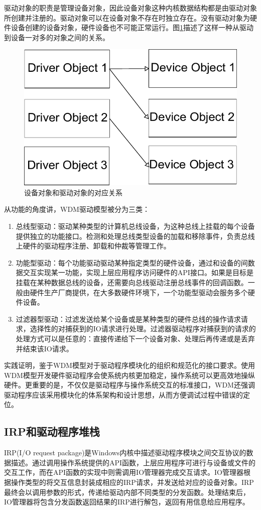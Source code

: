 驱动对象的职责是管理设备对象，因此设备对象这种内核数据结构都是由驱动对象所创建并注册的。驱动对象可以在设备对象不存在时独立存在。没有驱动对象为硬件设备创建的设备对象，硬件设备也不可能正常运行。图\ref{fig:drv-to-dev}描述了这样一种从驱动到设备一对多的对象之间的关系。
\begin{figure}[H]
\centering
\includegraphics[width=0.6\linewidth]{./graph/drv-to-dev}
\caption{设备对象和驱动对象的对应关系}
\label{fig:drv-to-dev}
\end{figure}

从功能的角度讲，WDM驱动模型被分为三类：
\begin{enumerate}
\item
总线型驱动：驱动某种类型的计算机总线设备，为这种总线上挂载的每个设备提供独立的功能接口。检测和处理总线类型设备的加载和移除事件，负责总线上硬件的驱动程序注册、卸载和仲裁等管理工作。
\item
功能型驱动：每个功能驱动驱动某种指定类型的硬件设备，通过和设备的间数据交互实现某一功能，实现上层应用程序访问硬件的API接口。如果是目标是挂载在某种数据总线的设备，还需要向总线驱动注册总线事件的回调函数。一般由硬件生产厂商提供，在大多数硬件环境下，一个功能型驱动会服务多个硬件设备。
\item
过滤器型驱动：过滤发送给某个设备或是某种类型的硬件总线的操作请求请求，选择性的对捕获到的IO请求进行处理。过滤器驱动程序对捕获到的请求的处理方式可以是任意的：直接传递给下一个设备对象、处理后再传递或是丢弃并结束该IO请求。
\end{enumerate}

实践证明，鉴于WDM模型对于驱动程序模块化的组织和规范化的接口要求。使用WDM模型开发硬件驱动程序会使系统内核更加稳定，操作系统可以更高效地操纵硬件。更重要的是，不仅仅是驱动程序与操作系统交互的标准接口，WDM还强调驱动程序应该采用模块化的体系架构和设计思想，从而方便调试过程中错误的定位。

\subsection{IRP和驱动程序堆栈}
IRP(I/O request package)是Windows内核中描述驱动程序模块之间交互协议的数据描述。通过调用操作系统提供的API函数，上层应用程序可进行与设备或文件的交互工作，而在API函数的实现中则需调用IO管理器完成交互请求。IO管理器根据操作类型的将交互信息封装成相应的IRP请求，并发送给对应的设备对象。IRP最终会以调用参数的形式，传递给驱动内部不同类型的分发函数。处理结束后，IO管理器将包含分发函数返回结果的IRP进行解包，返回有用信息给应用程序。

